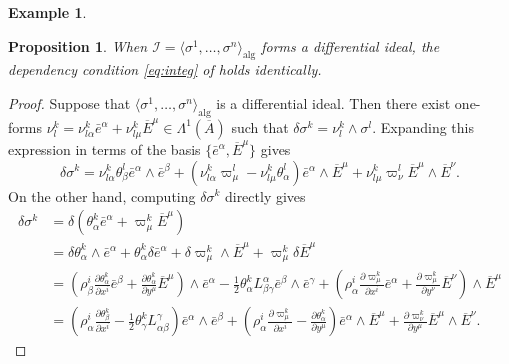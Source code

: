 \documentclass[11pt]{article}
\theoremstyle{plain}
\newtheorem{proposition}{Proposition}
\theoremstyle{definition}
\newtheorem{example}{Example}
\begin{document}
\begin{example}
\begin{proposition} \label{prop:depcond}
When $\mathcal{I}=\langle \sigma^1,\dots,\sigma^n\rangle_{\mathrm{alg}}$ forms a differential ideal, the dependency condition \eqref{eq:integ} of  holds identically.
\end{proposition}
\begin{proof}
Suppose that $\langle \sigma^1,\dots,\sigma^n\rangle_{\mathrm{alg}}$ is a differential ideal. Then there exist one-forms $\nu_l^k=\nu_{l\alpha}^k \bar{e}^{\alpha}+\nu_{l\mu}^k \overline{E}^{\mu}\in \Lambda^1(\overline{A})$ such that $\delta \sigma^k=\nu_l^k\wedge \sigma^l$. Expanding this expression in terms of the basis $\{\bar{e}^{\alpha},\overline{E}^{\mu}\}$ gives
\begin{equation*}
    \delta \sigma^k=\nu_{l\alpha}^k \theta_{\beta}^l \bar{e}^{\alpha}\wedge \bar{e}^{\beta}+(\nu_{l\alpha}^k \varpi_{\mu}^l-\nu_{l\mu}^k \theta_{\alpha}^l) \bar{e}^{\alpha}\wedge \overline{E}^{\mu}+\nu_{l\mu}^k \varpi_{\nu}^l \overline{E}^{\mu}\wedge \overline{E}^{\nu}.
\end{equation*}
On the other hand, computing $\delta \sigma^k$ directly gives
\begin{align*}
    \delta \sigma^k&=\delta(\theta_{\alpha}^k \bar{e}^{\alpha}+\varpi_{\mu}^k \overline{E}^{\mu})\\&=\delta \theta_{\alpha}^k\wedge \bar{e}^{\alpha}+\theta_{\alpha}^k \delta \bar{e}^{\alpha}+\delta \varpi_{\mu}^k\wedge \overline{E}^{\mu}+\varpi_{\mu}^k \delta \overline{E}^{\mu}\\&=\left(\rho_{\beta}^i \frac{\partial \theta_{\alpha}^k}{\partial x^i} \bar{e}^{\beta}+\frac{\partial \theta_{\alpha}^k}{\partial y^{\mu}}\overline{E}^{\mu}\right)\wedge \bar{e}^{\alpha}-\frac{1}{2} \theta_{\alpha}^k L_{\beta \gamma}^{\alpha}\bar{e}^{\beta}\wedge \bar{e}^{\gamma}+\left(\rho_{\alpha}^i \frac{\partial \varpi_{\mu}^k}{\partial x^i} \bar{e}^{\alpha}+\frac{\partial \varpi_{\mu}^k}{\partial y^{\nu}}\overline{E}^{\nu}\right)\wedge \overline{E}^{\mu}\\&=\left(\rho_{\alpha}^i \frac{\partial \theta_{\beta}^k}{\partial x^i}-\frac{1}{2} \theta_{\gamma}^k L_{\alpha \beta}^{\gamma}\right)\bar{e}^{\alpha}\wedge \bar{e}^{\beta}+\left(\rho_{\alpha}^i \frac{\partial \varpi_{\mu}^k}{\partial x^i}-\frac{\partial \theta_{\alpha}^k}{\partial y^{\mu}}\right)\bar{e}^{\alpha}\wedge \overline{E}^{\mu}+\frac{\partial \varpi_{\nu}^k}{\partial y^{\mu}}\overline{E}^{\mu}\wedge \overline{E}^{\nu}.
\end{align*}

\end{proof}
\end{example}
\end{document}
